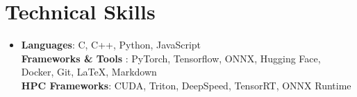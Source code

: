 \documentclass[letterpaper,11pt]{article}
\makeatletter
\newcommand{\resumeItem}[1]{
  \item\small{
    {#1 \vspace{-2pt}}
  }
}
\newcommand{\resumeProjectHeading}[2]{
    \item
    \begin{tabular*}{1.001\textwidth}{l@{\extracolsep{\fill}}r}
      \small#1 & \textbf{\small #2}\\
    \end{tabular*}\vspace{-7pt}
}
\newcommand{\resumeItemListStart}{\begin{itemize}}
\newcommand{\resumeItemListEnd}{\end{itemize}\vspace{-5pt}}
\makeatother
\begin{document}



 
  

% 
%
\section{Technical Skills}
 \begin{itemize}[leftmargin=0.15in, label={}]
    \item{
     \textbf{Languages}{:  C, C++, Python, JavaScript} \\
     \vspace{5pt}
     \textbf{Frameworks \& Tools }{:  PyTorch, Tensorflow, ONNX, Hugging Face, Docker, Git, LaTeX, Markdown } \\
     \vspace{5pt}
     \textbf{HPC Frameworks}{: CUDA, Triton, DeepSpeed, TensorRT, ONNX Runtime}
    }
 \end{itemize}
 \vspace{-16pt}
\end{document}
